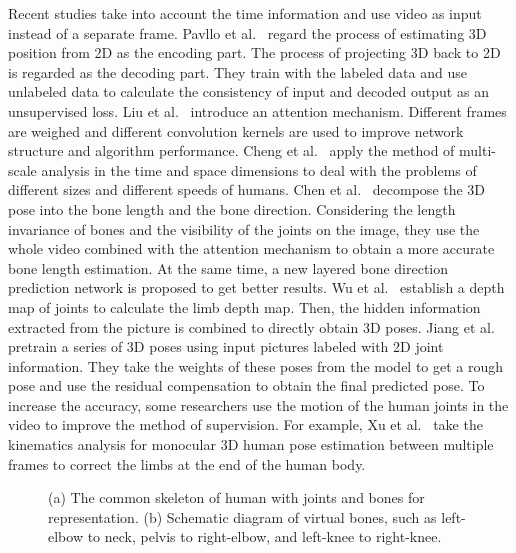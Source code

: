 \documentclass[journal]{IEEEtran}
\begin{document}
Recent studies \cite{20183D,2020Attention,20203DCheng,20203DWu,2019Reweighted} take into account the time information and use video as input instead of a separate frame. Pavllo et al.~\cite{20183D} regard the process of estimating 3D position from 2D as the encoding part. The process of projecting 3D back to 2D is regarded as the decoding part. They train with the labeled data and use unlabeled data to calculate the consistency of input and decoded output as an unsupervised loss. Liu et al.~\cite{2020Attention} introduce an attention mechanism. Different frames are weighed and different convolution kernels are used to improve network structure and algorithm performance. Cheng et al.~\cite{20203DCheng} apply the method of multi-scale analysis in the time and space dimensions to deal with the problems of different sizes and different speeds of humans. Chen et al.~\cite{2020Anatomy} decompose the 3D pose into the bone length and the bone direction. Considering the length invariance of bones and the visibility of the joints on the image, they use the whole video combined with the attention mechanism to obtain a more accurate bone length estimation. At the same time, a new layered bone direction prediction network is proposed to get better results. Wu et al.~\cite{20203DWu} establish a depth map of joints to calculate the limb depth map. Then, the hidden information extracted from the picture is combined to directly obtain 3D poses. Jiang et al.~\cite{2019Reweighted} pretrain a series of 3D poses using input pictures labeled with 2D joint information. They take the weights of these poses from the model to get a rough pose and use the residual compensation to obtain the final predicted pose.
To increase the accuracy, some researchers use the motion of the human joints in the video to improve the method of supervision. For example, Xu et al.~\cite{2020Deep} take the kinematics analysis for monocular 3D human pose estimation between multiple frames to correct the limbs at the end of the human body.


\begin{figure}
	\centering
	\vspace{-3pt}
	\caption{(a) The common skeleton of human with joints and bones for representation. (b) Schematic diagram of virtual bones, such as left-elbow to neck, pelvis to right-elbow, and left-knee to right-knee.}
	\vspace{-0pt}
\end{figure}
\end{document}
